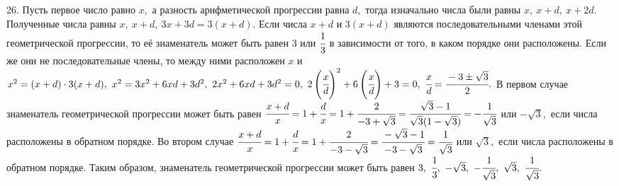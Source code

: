 26. Пусть первое число равно $x,$ а разность арифметической прогрессии равна $d,$ тогда изначально числа были равны $x,\ x+d,\ x+2d.$ Полученные числа равны $x,\ x+d,\ 3x+3d=3(x+d).$ Если числа $x+d$ и $3(x+d)$ являются последовательными членами этой геометрической прогрессии, то её знаменатель может быть равен 3 или $\cfrac{1}{3}$ в зависимости от того, в каком порядке они расположены. Если же они не последовательные члены, то между ними расположен $x$ и $x^2=(x+d)\cdot3(x+d),\
x^2=3x^2+6xd+3d^2,\ 2x^2+6xd+3d^2=0,\ 2\left(\cfrac{x}{d}\right)^2+6\left(\cfrac{x}{d}\right)+3=0,\ \cfrac{x}{d}=\cfrac{-3\pm\sqrt{3}}{2}.$ В первом случае знаменатель геометрической прогрессии может быть равен $\cfrac{x+d}{x}=1+\cfrac{d}{x}=1+\cfrac{2}{-3+\sqrt{3}}=\cfrac{\sqrt{3}-1}{\sqrt{3}(1-\sqrt{3})}=-\cfrac{1}{\sqrt{3}}$ или $-\sqrt{3},$ если числа расположены в обратном порядке. Во втором случае $\cfrac{x+d}{x}=1+\cfrac{d}{x}=1+\cfrac{2}{-3-\sqrt{3}}=\cfrac{-\sqrt{3}-1}{-3-\sqrt{3}}=\cfrac{1}{\sqrt{3}}$ или
$\sqrt{3},$ если числа расположены в обратном порядке.
Таким образом, знаменатель геометрической прогрессии может быть равен $3,\ \cfrac{1}{3},\ -\sqrt{3},\ -\cfrac{1}{\sqrt{3}},\ \sqrt{3},\ \cfrac{1}{\sqrt{3}}.$\\
